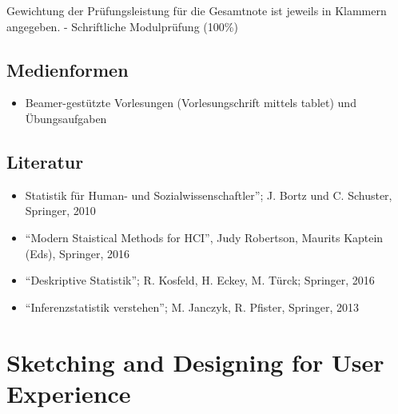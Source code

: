 Gewichtung der Prüfungsleistung für die Gesamtnote ist jeweils in
Klammern angegeben. - Schriftliche Modulprüfung (100\%)

\section*{Medienformen\label{/mi-2017/modulbeschreibungen-master/MA_HCI_Modul_Statistical_Methods_for_HCI}}\label{medienformenpathlabelmi-2017modulbeschreibungen-mastermaux5fhciux5fmodulux5fstatisticalux5fmethodsux5fforux5fhci}

\begin{itemize}
\tightlist
\item
  Beamer-gestützte Vorlesungen (Vorlesungschrift mittels tablet) und
  Übungsaufgaben
\end{itemize}

\section*{Literatur\label{/mi-2017/modulbeschreibungen-master/MA_HCI_Modul_Statistical_Methods_for_HCI}}\label{literaturpathlabelmi-2017modulbeschreibungen-mastermaux5fhciux5fmodulux5fstatisticalux5fmethodsux5fforux5fhci}

\begin{itemize}
\tightlist
\item
  Statistik für Human- und Sozialwissenschaftler''; J. Bortz und C.
  Schuster, Springer, 2010
\item
  ``Modern Staistical Methods for HCI'', Judy Robertson, Maurits Kaptein
  (Eds), Springer, 2016
\item
  ``Deskriptive Statistik''; R. Kosfeld, H. Eckey, M. Türck; Springer,
  2016
\item
  ``Inferenzstatistik verstehen''; M. Janczyk, R. Pfister, Springer,
  2013
\end{itemize}

\chapter{Sketching and Designing for User
Experience\label{/mi-2017/modulbeschreibungen-master/MA_HCI_Sketching_and_Designing_for_User_Experience}}\label{sketching-and-designing-for-user-experiencepathlabelmi-2017modulbeschreibungen-mastermaux5fhciux5fsketchingux5fandux5fdesigningux5fforux5fuserux5fexperience}

